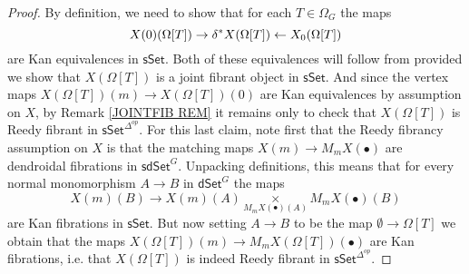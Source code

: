 \documentclass[a4paper,10pt
,draft
]{article}%
\numberwithin{equation}{section}
\numberwithin{figure}{section}
\theoremstyle{definition} %
\newcommand{\1}{\ensuremath{\mathbbm 1}}%
\begin{document}
\begin{proof}
By definition,
we need to show that for each $T \in \Omega_G$ the maps 
\[
	X(0)(\Omega[T]) \to 
	\delta^{\**} X (\Omega[T]) \leftarrow
	X_0 (\Omega[T])
\]	
are Kan equivalences in $\mathsf{sSet}$.
Both of these equivalences will follow from 
\cite[Prop. 4.5(iv)]{BP_edss}
provided we show that
$X(\Omega[T])$ is a joint fibrant object in $\mathsf{sSet}$.
And since the vertex maps 
$X(\Omega[T])(m) \to X(\Omega[T])(0)$
are Kan equivalences by assumption on $X$,
by Remark \ref{JOINTFIB REM} it remains only to check that
$X(\Omega[T])$
is Reedy fibrant in $\mathsf{sSet}^{\Delta^{op}}$.
For this last claim, 
note first that the Reedy fibrancy 
assumption on $X$ is that the matching maps 
$X(m) \to M_m X(\bullet)$
are dendroidal fibrations in 
$\mathsf{sdSet}^G$.
Unpacking definitions,
this means that for every normal monomorphism 
$A \to B$ in $\mathsf{dSet}^G$ the maps
\[
X(m)(B) \to 
X(m)(A) \underset{{M_m X(\bullet)(A)}}{\times} M_m X(\bullet)(B)
\]
are Kan fibrations in $\mathsf{sSet}$.
But now setting $A \to B$ to be the map $\emptyset \to \Omega[T]$
we obtain that the maps
$X(\Omega[T])(m) \to 
M_m X(\Omega[T])(\bullet)$
are Kan fibrations, i.e. that 
$X(\Omega[T])$ is indeed Reedy fibrant
in $\mathsf{sSet}^{\Delta^{op}}$.
\end{proof}
\end{document}
